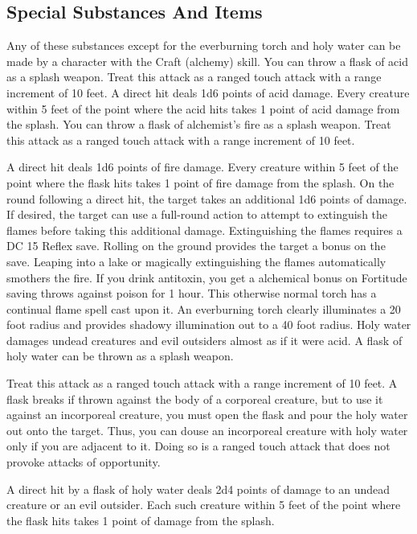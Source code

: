 \subsection{Special Substances And Items}
Any of these substances except for the everburning torch and holy water can be made by a character with the Craft (alchemy) skill.
 You can throw a flask of acid as a splash weapon. Treat this attack as a ranged touch attack with a range increment of 10 feet. A direct hit deals 1d6 points of acid damage. Every creature within 5 feet of the point where the acid hits takes 1 point of acid damage from the splash.
 You can throw a flask of alchemist's fire as a splash weapon. Treat this attack as a ranged touch attack with a range increment of 10 feet.
\par A direct hit deals 1d6 points of fire damage. Every creature within 5 feet of the point where the flask hits takes 1 point of fire damage from the splash. On the round following a direct hit, the target takes an additional 1d6 points of damage. If desired, the target can use a full-round action to attempt to extinguish the flames before taking this additional damage. Extinguishing the flames requires a DC 15 Reflex save. Rolling on the ground provides the target a  bonus on the save. Leaping into a lake or magically extinguishing the flames automatically smothers the fire.
 If you drink antitoxin, you get a  alchemical bonus on Fortitude saving throws against poison for 1 hour.
 This otherwise normal torch has a continual flame spell cast upon it. An everburning torch clearly illuminates a 20 foot radius and provides shadowy illumination out to a 40 foot radius.
 Holy water damages undead creatures and evil outsiders almost as if it were acid. A flask of holy water can be thrown as a splash weapon.
\par Treat this attack as a ranged touch attack with a range increment of 10 feet. A flask breaks if thrown against the body of a corporeal creature, but to use it against an incorporeal creature, you must open the flask and pour the holy water out onto the target. Thus, you can douse an incorporeal creature with holy water only if you are adjacent to it. Doing so is a ranged touch attack that does not provoke attacks of opportunity.
\par A direct hit by a flask of holy water deals 2d4 points of damage to an undead creature or an evil outsider. Each such creature within 5 feet of the point where the flask hits takes 1 point of damage from the splash.

